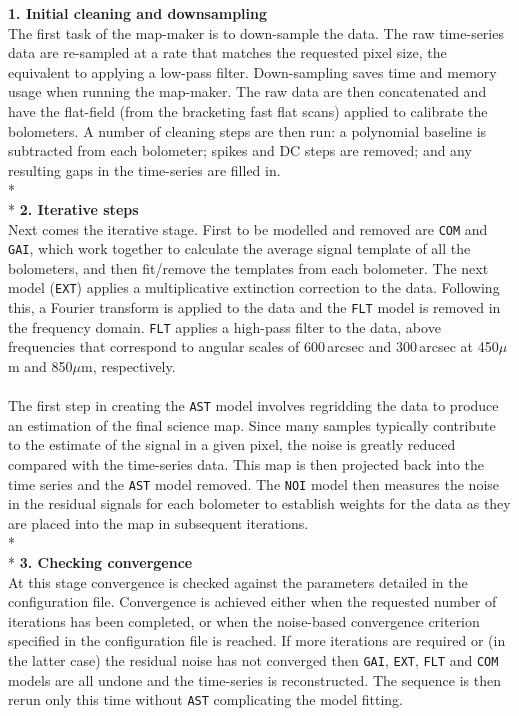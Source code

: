 \documentclass[twoside,11pt]{article}
\renewcommand{\_}{\texttt{\symbol{95}}}
\newcommand{\model}[1]{\texttt{#1}}
\begin{document}
\begin{center}
\begin{minipage}[t]{0.95\linewidth}
\textbf{1. Initial cleaning and downsampling}\\
The first task of the map-maker is to down-sample the data. The
raw time-series data are re-sampled at a rate that matches the
requested pixel size, the equivalent to applying a low-pass filter.
Down-sampling saves time and memory usage when running the map-maker.
The raw data are then concatenated and have the flat-field (from the
bracketing fast flat scans) applied to calibrate the bolometers. A
number of cleaning steps are then run: a polynomial baseline is
subtracted from each bolometer; spikes and DC steps are removed; and
any resulting gaps in the time-series are filled in.
\\*\\*
\textbf{2. Iterative steps}\\
Next comes the iterative stage. First to be modelled
and removed are \model{COM} and \model{GAI}, which work together to
calculate the average signal template of all the bolometers, and then
fit/remove the templates from each bolometer. The next model
(\model{EXT}) applies a multiplicative extinction correction to the
data. Following this, a Fourier transform is applied to the data and
the \model{FLT} model is removed in the frequency domain.
\model{FLT} applies a high-pass filter to the data, above frequencies
that correspond to angular scales of 600\,arcsec and 300\,arcsec at
450$\mu$m and 850$\mu$m, respectively.
\\\\
The first step in creating the  \model{AST} model involves
regridding the data to produce an estimation of the final science map.
Since many samples typically contribute to the estimate of the signal
in a given pixel, the noise is greatly reduced compared with the
time-series data. This map is then projected back into the time series
and the \model{AST} model removed. The \model{NOI} model then
measures the noise in the residual signals for each bolometer to
establish weights for the data as they are placed into the map in
subsequent iterations.
\\*\\*
\textbf{3. Checking convergence}\\
At this stage convergence is checked against the parameters detailed
in the configuration file. Convergence is achieved either when the
requested number of iterations has been completed, or when the
noise-based convergence criterion specified in the configuration file
is reached. If more iterations are required or (in the latter case)
the residual noise has not converged then \model{GAI}, \model{EXT},
\model{FLT} and \model{COM} models are all undone and the
time-series is reconstructed. The sequence is then rerun only this
time without \model{AST} complicating the model fitting.
\end{minipage}
\end{center}
\end{document}
